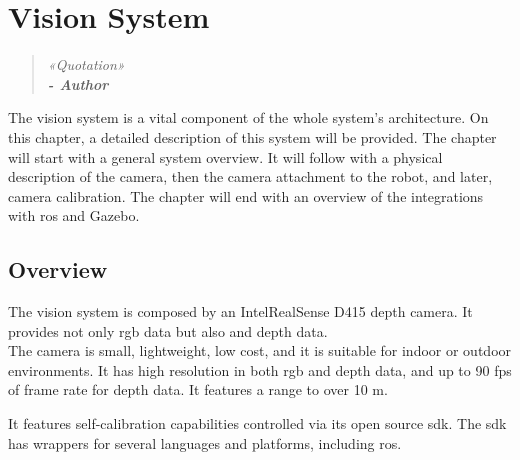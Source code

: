 \chapter{Vision System}
\label{cha:vision_system}

\begin{quotation}
\begin{flushright}
\itshape
«Quotation»\\
\textbf{- Author}
\end{flushright}
\end{quotation}

The vision system is a vital component of the whole system's architecture. On this chapter, a detailed description of this system will be provided. The chapter will start with a general system overview. It will follow with a physical description of the camera, then the camera attachment to the robot, and later, camera calibration. The chapter will end with an overview of the integrations with \gls{ros} and Gazebo.


\section{Overview}
\label{sec:vision_system_overview}

The vision system is composed by an Intel\textregistered RealSense\texttrademark{} D415 depth camera. It provides not only \gls{rgb} data but also  and depth data.\\

The camera is small, lightweight, low cost, and it is suitable for indoor or outdoor environments. It has high resolution in both \gls{rgb} and depth data, and up to 90 \gls{fps} of frame rate for depth data. It features a range to over 10 \si{\meter}.

It features self-calibration capabilities controlled via its open source \gls{sdk}. The \gls{sdk} has wrappers for several languages and platforms, including \gls{ros}.



